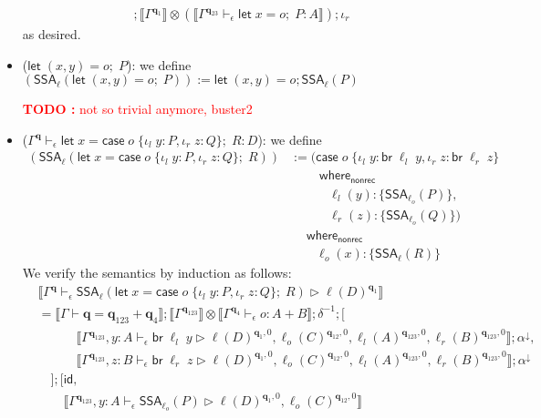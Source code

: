 \documentclass[acmsmall,screen,review]{acmart}
\newcounter{todos}
\newcommand{\TODO}[1]{{
  \stepcounter{todos}
  \begin{center}\large{\textcolor{red}{\textbf{TODO \arabic{todos}:} #1}}\end{center}
}}
\newcommand{\mb}[1]{\ensuremath{\mathbf{#1}}}
\newcommand{\ms}[1]{\ensuremath{\mathsf{#1}}}
\newcommand{\lto}{:}
\newcommand{\linl}[1]{\iota_l\;{#1}}
\newcommand{\linr}[1]{\iota_r\;{#1}}
\newcommand{\letexpr}[3]{\ensuremath{\ms{let}\;#1 = #2;\;#3}}
\newcommand{\caseexpr}[5]{\ms{case}\;#1\;\{\linl{#2} \lto #3, \linr{#4} \lto #5\}}
\newcommand{\letstmt}[3]{\ensuremath{\ms{let}\;#1 = #2; #3}}
\newcommand{\brb}[2]{\ms{br}\;#1\;#2}
\newcommand{\casestmt}[5]{\ms{case}\;#1\;\{\linl{#2} \lto #3, \linr{#4} \lto #5\}}
\newcommand{\awhere}[2]{#1\;\ms{where}_{\ms{nonrec}}\;#2}
\newcommand{\wbranch}[3]{#1(#2) \lto \{#3\}}
\newcommand{\qsp}[4]{#1 \vdash #2 = #3 + #4}
\newcommand{\hasty}[4]{#1 \vdash_{#2} #3: {#4}}
\newcommand{\haslb}[4]{#1 \vdash_{#2} #3 \rhd #4}
\newcommand{\tossa}[2]{\ms{SSA}_{#1}(#2)}
\newcommand{\dnt}[1]{\llbracket{#1}\rrbracket}
\begin{document}
\begin{itemize}
\begin{align*}
    ; \dnt{\Gamma^{\mb{q}_1}} \otimes (
      \dnt{\hasty{\Gamma^{\mb{q}_{23}}}{\epsilon}{\letexpr{x}{o}{P}}{A}}
    )
    ; \iota_r
  \end{align*}
  as desired.
  \item ($\letexpr{(x, y)}{o}{P}$): we define
  $(\tossa{\ell}{\letexpr{(x, y)}{o}{P}}) := \letstmt{(x, y)}{o}{\tossa{\ell}{P}}$
  \TODO{not so trivial anymore, buster2}
  \item ($\hasty{\Gamma^{\mb{q}}}{\epsilon}{\letexpr{x}{\caseexpr{o}{y}{P}{z}{Q}}{R}}{D}$): we
  define
  \begin{align*}
    (\tossa{\ell}{\letexpr{x}{\caseexpr{o}{y}{P}{z}{Q}}{R}})
    & := \awhere{(\awhere{\casestmt{o}{y}{\brb{\ell_l}{y}}{z}{\brb{\ell_r}{z}} \\ & \qquad }{
      \\ & \quad \qquad
      \wbranch{\ell_l}{y}{\tossa{\ell_o}{P}},
      \\ & \quad \qquad
      \wbranch{\ell_r}{z}{\tossa{\ell_o}{Q}})
    } \\ & \quad }{
      \\ & \qquad
      \wbranch{\ell_o}{x}{\tossa{\ell}{R}}
    }
  \end{align*}
  We verify the semantics by induction as follows:
  \begin{align*}
    & \dnt{
      \haslb{\Gamma^{\mb{q}}}{\epsilon}{\tossa{\ell}{\letexpr{x}{\caseexpr{o}{y}{P}{z}{Q}}{R}}}
      {\ell(D)^{\mb{q}_1}}
    } \\
    & = \dnt{\qsp{\Gamma}{\mb{q}}{\mb{q}_{123}}{\mb{q}_4}} 
      ; \dnt{\Gamma^{\mb{q}_{123}}} \otimes \dnt{\hasty{\Gamma^{\mb{q}_4}}{\epsilon}{o}{A + B}}
      ; \delta^{-1} ; [
      \\ & \quad \qquad
        \dnt{\haslb{\Gamma^{\mb{q}_{123}}, y : A}{\epsilon}{\brb{\ell_l}{y}}
          {
            \ell(D)^{\mb{q}_1, 0}, \ell_o(C)^{\mb{q}_{12}, 0}, 
            \ell_l(A)^{\mb{q}_{123}, 0}}, \ell_r(B)^{\mb{q}_{123}, 0}} 
          ; \alpha^\downarrow,
      \\ & \quad \qquad
        \dnt{\haslb{\Gamma^{\mb{q}_{123}}, z : B}{\epsilon}{\brb{\ell_r}{z}}
          {
            \ell(D)^{\mb{q}_1, 0}, \ell_o(C)^{\mb{q}_{12}, 0}, 
            \ell_l(A)^{\mb{q}_{123}, 0}}, \ell_r(B)^{\mb{q}_{123}, 0}} 
          ; \alpha^\downarrow
      \\ & \quad
      ];[
        \ms{id}, \\ & \qquad
        \dnt{
          \haslb{\Gamma^{\mb{q}_{123}}, y : A}{\epsilon}{\tossa{\ell_o}{P}}
                {\ell(D)^{\mb{q}_1, 0}, \ell_o(C)^{\mb{q}_{12}, 0}}
}
\end{align*}
\end{itemize}
\end{document}
